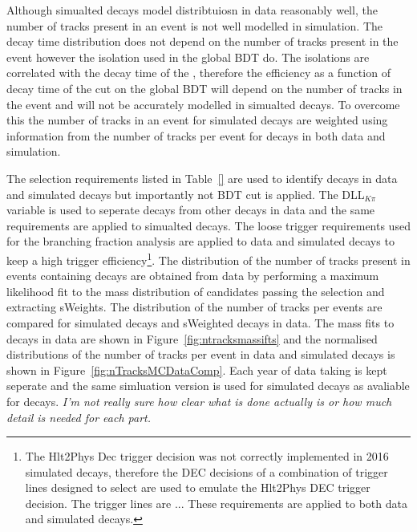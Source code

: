 Although simualted decays model distribtuiosn in data reasonably well, the number of tracks present in an event is not well modelled in simulation. %
The \bs decay time distribution does not depend on the number of tracks present in the event however the isolation used in the global BDT do. The isolations are correlated with the decay time of the \bs, therefore the efficiency as a function of decay time of the cut on the global BDT will depend on the number of tracks in the event and will not be accurately modelled in simualted decays.  
To overcome this the number of tracks in an event for simulated \bsmumu decays are weighted using information from the number of tracks per event for \bdkpi decays in both data and simulation. 

The selection requirements listed in Table~\ref{} are used to identify \bdkpi decays in data and simulated decays but importantly not BDT cut is applied. The DLL$_{K\pi}$ variable is used to seperate \bdkpi decays from other \bhh decays in data and the same requirements are applied to simualted decays. The loose trigger requirements used for the branching fraction analysis are applied to data and simulated decays to keep a high trigger efficiency\footnote{The Hlt2Phys Dec trigger decision was not correctly implemented in 2016 simulated decays, therefore the DEC decisions of a combination of trigger lines designed to select \bhh are used to emulate the Hlt2Phys DEC trigger decision. The trigger lines are ... These requirements are applied to both data and simulated decays.}. The distribution of the number of tracks present in events containing \bdkpi decays are obtained from data by performing a maximum likelihood fit to the \bd mass distribution of candidates passing the selection and extracting sWeights. The distribution of the number of tracks per events are compared for simulated \bdkpi decays and sWeighted \bdkpi decays in data. The mass fits to \bdkpi decays in data are shown in Figure~\ref{fig:ntracksmassifts} and the normalised distributions of the number of tracks per event in data and simulated decays is shown in Figure~\ref{fig:nTracksMCDataComp}. Each year of data taking is kept seperate and the same simluation version is used for \bdkpi simulated decays as avaliable for \bsmumu decays.
{\it I'm not really sure how clear what is done actually is or how much detail is needed for each part.} 



